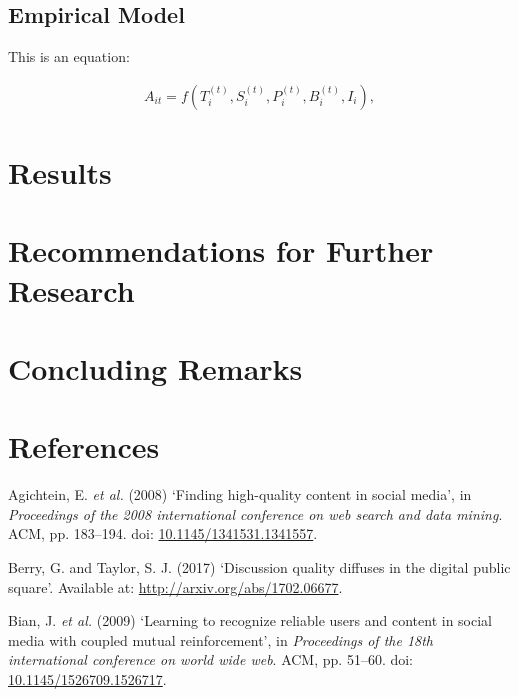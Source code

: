 \documentclass[11pt,preprint, authoryear]{article}
\numberwithin{equation}{section}
\numberwithin{figure}{section}
\numberwithin{table}{section}
\begin{document}
\subsection{\texorpdfstring{Empirical Model
\label{Model}}{Empirical Model }}\label{empirical-model}

This is an equation:

\begin{align} \label{eq:EP1}
A_{it}=f(T_i^{(t)},S_i^{(t)},P_i^{(t)},B_i^{(t)},I_i),
\end{align}

\section{\texorpdfstring{Results
\label{Results}}{Results }}\label{results}

\newpage

\section{\texorpdfstring{Recommendations for Further Research
\label{Recom}}{Recommendations for Further Research }}\label{recommendations-for-further-research}

\newpage

\section{\texorpdfstring{Concluding Remarks
\label{Concl}}{Concluding Remarks }}\label{concluding-remarks}

\newpage

\section{References}\label{references}

\hypertarget{refs}{}
\hypertarget{ref-Agichtein2008}{}
Agichtein, E. \emph{et al.} (2008) `Finding high-quality content in
social media', in \emph{Proceedings of the 2008 international conference
on web search and data mining}. ACM, pp. 183--194. doi:
\href{https://doi.org/10.1145/1341531.1341557}{10.1145/1341531.1341557}.

\hypertarget{ref-Berry2017}{}
Berry, G. and Taylor, S. J. (2017) `Discussion quality diffuses in the
digital public square'. Available at:
\url{http://arxiv.org/abs/1702.06677}.

\hypertarget{ref-Bian2009}{}
Bian, J. \emph{et al.} (2009) `Learning to recognize reliable users and
content in social media with coupled mutual reinforcement', in
\emph{Proceedings of the 18th international conference on world wide
web}. ACM, pp. 51--60. doi:
\href{https://doi.org/10.1145/1526709.1526717}{10.1145/1526709.1526717}.
\end{document}
